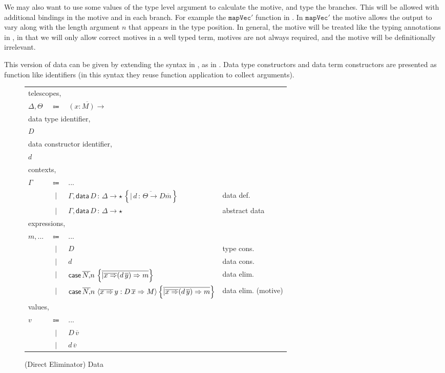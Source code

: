 We may also want to use some values of the type level argument to calculate the motive, and type the branches.
This will be allowed with additional bindings in the motive and in each branch.
For example the $\mathtt{mapVec'}$ function in .
In $\mathtt{mapVec'}$ the motive allows the output to vary along with the length argument $n$ that appears in the type position.
In general, the motive will be treated like the typing annotations in , in that we will only allow correct motives in a well typed term, motives are not always required, and the motive will be definitionally irrelevant.

This version of data can be given by extending the \slang{} syntax in , as in .
Data type constructors and data term constructors are presented as function like identifiers (in this syntax they reuse function application to collect arguments).

\begin{figure}
\begin{tabular}{lcll}

\multicolumn{4}{l}{telescopes,}\tabularnewline
$\Delta,\varTheta$ & $\Coloneqq$ & $\overline{\left(x:M\right)\rightarrow}$ & \tabularnewline
\multicolumn{4}{l}{data type identifier,}\tabularnewline
$D$ &  &  & \tabularnewline
\multicolumn{4}{l}{data constructor identifier,}\tabularnewline
$d$ &  &  & \tabularnewline
\multicolumn{4}{l}{contexts,}\tabularnewline
$\Gamma$ & $\Coloneqq$ & ... & \tabularnewline
 & $|$ & $\Gamma,\mathsf{data}\,D\,:\,\Delta\rightarrow\star\,\left\{ \overline{|\,d\,:\,\varTheta\rightarrow D\overline{m}}\right\} $ & data def.\tabularnewline
 & $|$ & $\Gamma,\mathsf{data}\,D\,:\,\Delta\rightarrow\star$ & abstract data\tabularnewline
 \multicolumn{4}{l}{expressions,}\tabularnewline
$m,...$ & $\Coloneqq$ & ... & \tabularnewline
 & $|$ & $D$ & type cons.\tabularnewline
 & $|$ & $d$ & data cons.\tabularnewline
 & $|$ & $\mathsf{case}{}\,\overline{N,}n\,\left\{ \overline{|\overline{x\Rightarrow}(d\,\overline{y})\Rightarrow m}\right\} $ & data elim.\tabularnewline
 & $|$ & $\mathsf{case}{}\,\overline{N,}n\,\left\langle \overline{x\Rightarrow}\,y:D\,\overline{x}\Rightarrow M\right\rangle \left\{ \overline{|\overline{x\Rightarrow}(d\,\overline{y})\Rightarrow m}\right\} $ & data elim. (motive)\tabularnewline
\multicolumn{4}{l}{values,}\tabularnewline
$v$ & $\Coloneqq$ & ... & \tabularnewline
 & $|$ & $D\,\overline{v}$ & \tabularnewline
 & $|$ & $d\,\overline{v}$ & \tabularnewline
\end{tabular}

\caption{\SLang{} (Direct Eliminator) Data}
\label{fig:surface-data-min}
\end{figure}

